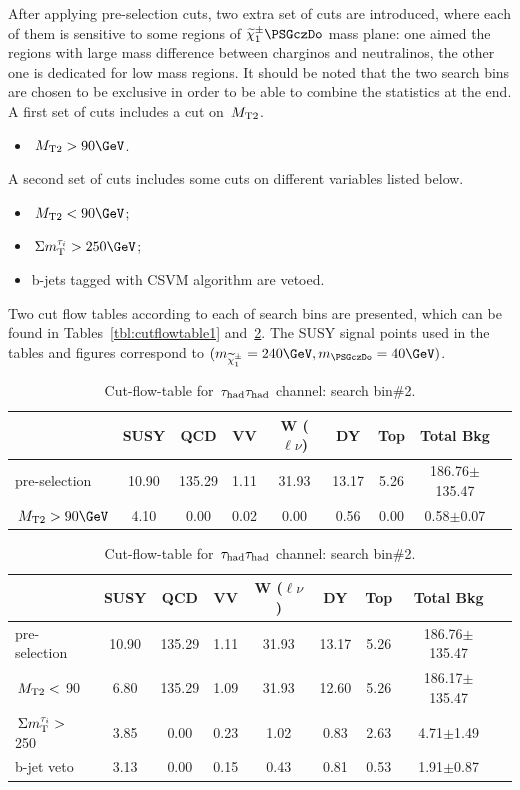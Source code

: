 After applying pre-selection cuts, two extra set of cuts are introduced, where each of them is sensitive to some regions of $\chione\PSGczDo$ mass plane: one aimed the regions with large mass difference between charginos and neutralinos, the other one is dedicated for low mass regions. It should be noted that the two search bins are chosen to be exclusive in order to be able to combine the statistics at the end.
A first set of cuts includes a cut on $\,{M_{\rm T2}}$.
\begin{itemize}
\item $\mttwo>90\GeV$.
\end{itemize}
A second set of cuts includes some cuts on different variables listed below.
\begin{itemize}
\item $\mttwo<90\GeV$;
\item $\SumMT>250\GeV$;
\item b-jets tagged with CSVM algorithm are vetoed.
\end{itemize}
Two cut flow tables according to each of search bins are presented, which can be found in Tables~\ref{tbl:cutflowtable1} and~\ref{tbl:cutflowtable2}. The SUSY signal points used in the tables and figures correspond to $(m_{\chione}=240\GeV,m_{\PSGczDo}=40\GeV)$.   
\begin{table}
\begin{center}
\begin{tabular}{lcccccccc}
\hline\hline
  &SUSY&QCD&VV&W ($\ell\nu$)&DY&Top&Total Bkg&\\
\hline\hline
pre-selection &10.90&135.29&1.11&31.93&13.17&5.26&186.76$\pm$135.47&\\
$\mttwo>90\GeV$&4.10&0.00&0.02&0.00&0.56&0.00&0.58$\pm$0.07&\\
\hline\hline
\end{tabular}
\caption{Cut-flow-table for $\,\tau_{\rm had}\tau_{\rm had}$ channel: search bin\#1.}
\label{tbl:cutflowtable1}
\begin{tabular}{lcccccccc}
\hline\hline
  &SUSY&QCD&VV&W ($\ell\nu$)&DY&Top&Total Bkg&\\
\hline\hline
pre-selection &10.90&135.29&1.11&31.93&13.17&5.26&186.76$\pm$135.47&\\
$\,{M_{\rm T2}} < $ 90 &6.80&135.29&1.09&31.93&12.60&5.26&186.17$\pm$135.47&\\
$\,\Sigma m_{\rm T}^{\tau_i} > $ 250 &3.85&0.00&0.23&1.02&0.83&2.63&4.71$\pm$1.49&\\
b-jet veto &3.13&0.00&0.15&0.43&0.81&0.53&1.91$\pm$0.87&\\
\hline\hline
\end{tabular}
\caption{Cut-flow-table for $\,\tau_{\rm had}\tau_{\rm had}$ channel: search bin\#2.}
\label{tbl:cutflowtable2}
\end{center}
\end{table}
